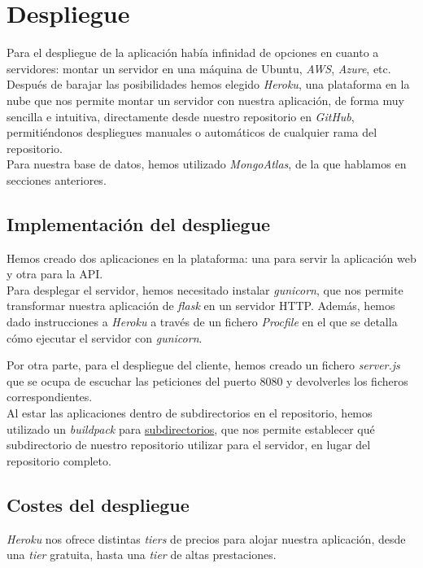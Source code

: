 \section{Despliegue}\label{sec:despliegue}
Para el despliegue de la aplicación había infinidad de opciones en cuanto a servidores: montar un servidor en una
máquina de Ubuntu, \textit{AWS}\cite{aws}, \textit{Azure}\cite{azure}, etc.\\

Después de barajar las posibilidades hemos elegido \textit{Heroku}, una plataforma en la nube que nos permite montar un
servidor con nuestra aplicación, de forma muy sencilla e intuitiva, directamente desde nuestro repositorio en
\textit{GitHub}, permitiéndonos despliegues manuales o automáticos de cualquier rama del repositorio.\\

Para nuestra base de datos, hemos utilizado \textit{MongoAtlas}, de la que hablamos en secciones anteriores.\\

\subsection{Implementación del despliegue}
Hemos creado dos aplicaciones en la plataforma: una para servir la aplicación web y otra para la API.\\

Para desplegar el servidor, hemos necesitado instalar \textit{gunicorn}\cite{gunicorn}, que nos permite transformar
nuestra aplicación de \textit{flask} en un servidor HTTP. Además, hemos dado instrucciones a \textit{Heroku} a través de
un fichero \textit{Procfile} en el que se detalla cómo ejecutar el servidor con \textit{gunicorn}.

Por otra parte, para el despliegue del cliente, hemos creado un fichero \textit{server.js} que se ocupa de escuchar las
peticiones del puerto 8080 y devolverles los ficheros correspondientes.\\

Al estar las aplicaciones dentro de subdirectorios en el repositorio, hemos utilizado un \textit{buildpack} para
\href{https://github.com/timanovsky/subdir-heroku-buildpack.git}{subdirectorios}, que nos permite establecer qué
subdirectorio de nuestro repositorio utilizar para el servidor, en lugar del repositorio completo.\\

\subsection{Costes del despliegue}\label{sec:costes-despliegue}
\textit{Heroku} nos ofrece distintas \textit{tiers} de precios para alojar nuestra aplicación, desde una \textit{tier}
gratuita, hasta una \textit{tier} de altas prestaciones.\\

